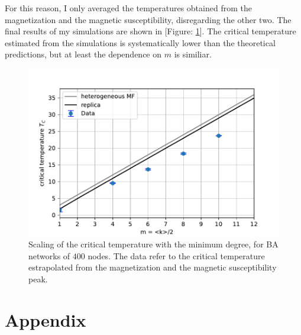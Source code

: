 \noindent For this reason, I only averaged the temperatures obtained from the magnetization and the magnetic susceptibility, disregarding the other two. The final results of my simulations are shown in [Figure: \ref{fig:final_ising}]. The critical temperature estimated from the simulations is systematically lower than the theoretical predictions, but at least the dependence on $m$ is similiar.
\begin{figure}[H]
    \centering
    \includegraphics[width=0.8\linewidth]{latex_source/images/ising/BA_temperatures.pdf}
    \caption{Scaling of the critical temperature with the minimum degree, for BA networks of $400$ nodes. The data refer to the critical temperature estrapolated from the magnetization and the magnetic susceptibility peak.}
    \label{fig:final_ising}
\end{figure}

\newpage
\section*{Appendix}

